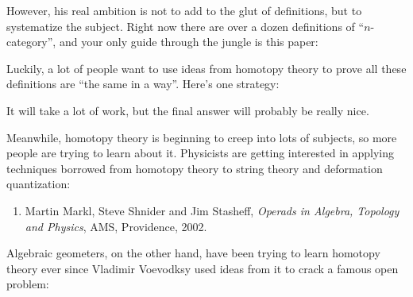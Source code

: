 \documentclass{article}
\def\tightlist{}
\renewcommand{\texttt}[1]{%
  \begingroup
  \ttfamily
  \begingroup\lccode`~=`/\lowercase{\endgroup\def~}{/\discretionary{}{}{}}%
  \begingroup\lccode`~=`[\lowercase{\endgroup\def~}{[\discretionary{}{}{}}%
  \begingroup\lccode`~=`.\lowercase{\endgroup\def~}{.\discretionary{}{}{}}%
  \catcode`/=\active\catcode`[=\active\catcode`.=\active
  \scantokens{#1\noexpand}%
  \endgroup
}
\begin{document}

However, his real ambition is not to add to the glut of definitions, but
to systematize the subject. Right now there are over a dozen definitions
of ``\(n\)-category'', and your only guide through the jungle is this
paper:


Luckily, a lot of people want to use ideas from homotopy theory to prove
all these definitions are ``the same in a way''. Here's one strategy:


It will take a lot of work, but the final answer will probably be really
nice.

Meanwhile, homotopy theory is beginning to creep into lots of subjects,
so more people are trying to learn about it. Physicists are getting
interested in applying techniques borrowed from homotopy theory to
string theory and deformation quantization:

\begin{enumerate}
\def\labelenumi{\arabic{enumi})}
\setcounter{enumi}{3}
\tightlist
\item
  Martin Markl, Steve Shnider and Jim Stasheff, \emph{Operads in
  Algebra, Topology and Physics}, AMS, Providence, 2002.
\end{enumerate}

Algebraic geometers, on the other hand, have been trying to learn
homotopy theory ever since Vladimir Voevodksy used ideas from it to
crack a famous open problem:
\end{document}
